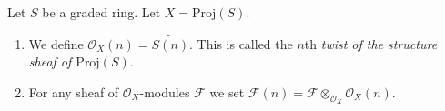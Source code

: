 \begin{definition}
\label{definition-twist}
Let $S$ be a graded ring. Let $X = \text{Proj}(S)$.
\begin{enumerate}
\item We define $\mathcal{O}_X(n) = \widetilde{S(n)}$.
This is called the $n$th
{\it twist of the structure sheaf of $\text{Proj}(S)$}.
\item For any sheaf of $\mathcal{O}_X$-modules $\mathcal{F}$ we set
$\mathcal{F}(n) = \mathcal{F} \otimes_{\mathcal{O}_X} \mathcal{O}_X(n)$.
\end{enumerate}
\end{definition}